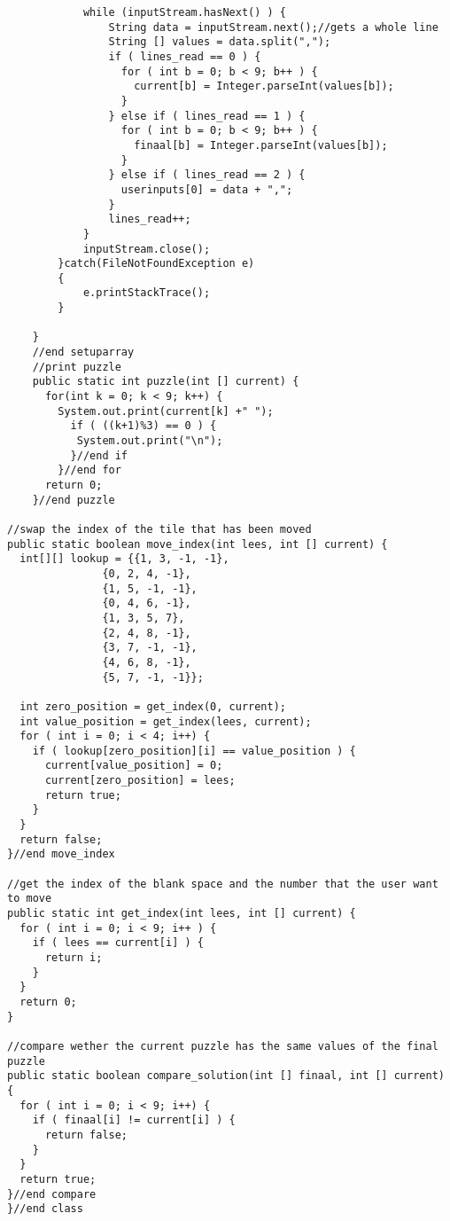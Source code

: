\documentclass[10pt]{article}
\begin{document}
\begin{tiny}
\begin{verbatim}
			while (inputStream.hasNext() ) {
				String data = inputStream.next();//gets a whole line
				String [] values = data.split(",");
				if ( lines_read == 0 ) {
				  for ( int b = 0; b < 9; b++ ) {
				    current[b] = Integer.parseInt(values[b]);
				  }
				} else if ( lines_read == 1 ) {
				  for ( int b = 0; b < 9; b++ ) {
				    finaal[b] = Integer.parseInt(values[b]);
				  }
				} else if ( lines_read == 2 ) {
				  userinputs[0] = data + ",";
				}
				lines_read++;	
			}	
			inputStream.close();
		}catch(FileNotFoundException e)
		{
			e.printStackTrace();
		}
		
	}		
	//end setuparray
	//print puzzle
	public static int puzzle(int [] current) {
      for(int k = 0; k < 9; k++) {
        System.out.print(current[k] +" ");
          if ( ((k+1)%3) == 0 ) {
           System.out.print("\n");
		  }//end if
        }//end for
      return 0;
	}//end puzzle
	
//swap the index of the tile that has been moved
public static boolean move_index(int lees, int [] current) {
  int[][] lookup = {{1, 3, -1, -1},
	 		   {0, 2, 4, -1},
	 		   {1, 5, -1, -1},
	 		   {0, 4, 6, -1},
	 		   {1, 3, 5, 7},
	 		   {2, 4, 8, -1},
	 		   {3, 7, -1, -1},
	 		   {4, 6, 8, -1},
	 		   {5, 7, -1, -1}};
	
  int zero_position = get_index(0, current);
  int value_position = get_index(lees, current);
  for ( int i = 0; i < 4; i++) {
    if ( lookup[zero_position][i] == value_position ) {
	  current[value_position] = 0;
	  current[zero_position] = lees;
	  return true;
	}
  }
  return false;
}//end move_index

//get the index of the blank space and the number that the user want to move
public static int get_index(int lees, int [] current) {
  for ( int i = 0; i < 9; i++ ) {
    if ( lees == current[i] ) {
	  return i;
	}
  }
  return 0;
}

//compare wether the current puzzle has the same values of the final puzzle
public static boolean compare_solution(int [] finaal, int [] current) {
  for ( int i = 0; i < 9; i++) {
    if ( finaal[i] != current[i] ) {
      return false;
	}
  }
  return true;
}//end compare
}//end class
  \end{verbatim}
   \end{tiny}
\end{document}
